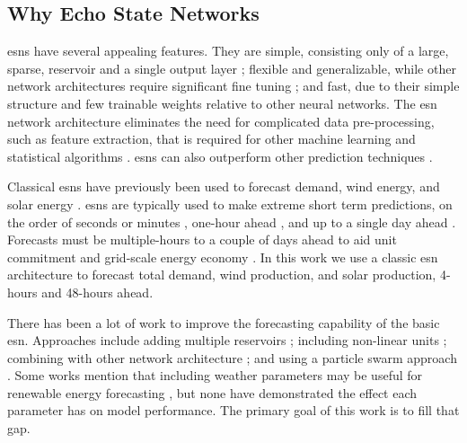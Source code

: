 \subsection{Why Echo State Networks}
\glspl{esn} have several appealing features. They are simple, consisting only
of a large, sparse, reservoir and a single output layer
\cite{lukosevicius_practical_2012}; flexible and generalizable,
while other network architectures require significant fine tuning
\cite{liu_deterministic_2019}; and fast, due to their simple structure and
few trainable weights relative to other neural networks. The \gls{esn} network
architecture eliminates the need for complicated data pre-processing, such as
feature extraction, that is required for other machine learning  and statistical
algorithms \cite{lazos_optimisation_2014, chen_day-ahead_2017}.
\glspl{esn} can also outperform other prediction techniques
\cite{jayawardene_comparison_2014,jayawardene_comparison_2015,shi_energy_2016,chitsazan_wind_2019, hu_forecasting_2020}.

Classical \glspl{esn} have previously been used to forecast demand, wind energy, and solar energy \cite{deihimi_application_2012,jayawardene_comparison_2015,hu_forecasting_2020}.
\glspl{esn} are typically used to make extreme short term predictions, on the
order of seconds or minutes
\cite{chen_novel_2019,wang_echo_2019,chitsazan_wind_2019}, one-hour ahead
\cite{shi_energy_2016}, and up to a single day ahead
\cite{deihimi_application_2012}. Forecasts must be multiple-hours to a
couple of days ahead to aid unit commitment and grid-scale energy economy
\cite{wang_quantifying_2016,mc_garrigle_quantifying_2015,brancucci_martinez-anido_value_2016}. In this work we use a classic \gls{esn} architecture to
forecast total demand, wind production, and solar production, 4-hours and 48-hours ahead.

There has been a lot of work to improve the forecasting capability of
the basic \gls{esn}. Approaches include adding multiple reservoirs
\cite{hu_forecasting_2020,gallicchio_deep_2019,yao_novel_2019,li_multi-reservoir_2020}; including non-linear units \cite{holzmann_echo_2008, chitsazan_wind_2019}; combining with other network architecture
\cite{chen_novel_2019, lopez_wind_2018}; and using a particle swarm approach \cite{chouikhi_pso-based_2017,wang_echo_2019}. Some works mention that
including weather parameters may be useful for renewable energy forecasting
\cite{li_echo_2019,chitsazan_wind_2019}, but none have demonstrated the effect
each parameter has on model performance. The primary goal of this work
is to fill that gap.

